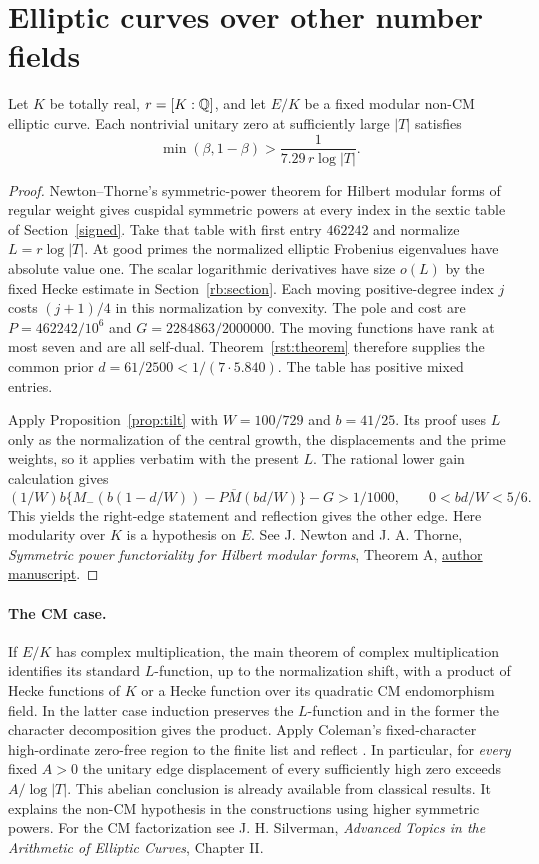 \documentclass[11pt]{article}
\begin{document}
\section{Elliptic curves over other number fields}\label{sec:fields}
\begin{corollary}
Let $K$ be totally real, $r=[K:\mathbb Q]$, and let $E/K$ be a fixed modular non-CM elliptic curve. Each nontrivial unitary zero at sufficiently large $|T|$ satisfies
\[
       \min(\beta,1-\beta)>\frac1{7.29\,r\log|T|}.
\]
\end{corollary}
\begin{proof}
Newton--Thorne's symmetric-power theorem for Hilbert modular forms of regular weight gives cuspidal symmetric powers at every index in the sextic table of Section~\ref{signed}. Take that table with first entry $462242$ and normalize $L=r\log|T|$. At good primes the normalized elliptic Frobenius eigenvalues have absolute value one. The scalar logarithmic derivatives have size $o(L)$ by the fixed Hecke estimate in Section~\ref{rb:section}. Each moving positive-degree index $j$ costs $(j+1)/4$ in this normalization by convexity. The pole and cost are $P=462242/10^6$ and $G=2284863/2000000$. The moving functions have rank at most seven and are all self-dual. Theorem~\ref{rst:theorem} therefore supplies the common prior $d=61/2500<1/(7\cdot5.840)$. The table has positive mixed entries.
  
Apply Proposition~\ref{prop:tilt} with $W=100/729$ and $b=41/25$. Its proof uses $L$ only as the normalization of the central growth, the displacements and the prime weights, so it applies verbatim with the present $L$. The rational lower gain calculation gives
\[
 (1/W)b\{M_-(b(1-d/W))-P\overline M(bd/W)\}-G>1/1000,
 \qquad 0<bd/W<5/6 .
\]
This yields the right-edge statement and reflection gives the other edge. Here modularity over $K$ is a hypothesis on $E$. See J. Newton and J. A. Thorne, \emph{Symmetric power functoriality for Hilbert modular forms}, Theorem A, \href{https://api.repository.cam.ac.uk/server/api/core/bitstreams/6bd9d94f-51d3-42e2-9cb1-ffc812189ac5/content}{author manuscript}.
\end{proof}
\paragraph{The CM case.}
If $E/K$ has complex multiplication, the main theorem of complex multiplication identifies its standard $L$-function, up to the normalization shift, with a product of Hecke functions of $K$ or a Hecke function over its quadratic CM endomorphism field. In the latter case induction preserves the $L$-function and in the former the character decomposition gives the product. Apply Coleman's fixed-character high-ordinate zero-free region to the finite list and reflect \cite{Coleman}. In particular, for \emph{every} fixed $A>0$ the unitary edge displacement of every sufficiently high zero exceeds $A/\log|T|$. This abelian conclusion is already available from classical results. It explains the non-CM hypothesis in the constructions using higher symmetric powers. For the CM factorization see J. H. Silverman, \emph{Advanced Topics in the Arithmetic of Elliptic Curves}, Chapter II.
\end{document}
